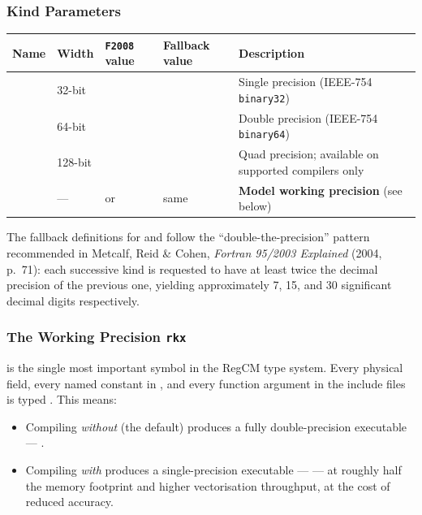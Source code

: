 \subsubsection{Kind Parameters}

\begin{longtable}{L{0.9cm} L{1.2cm} L{2.2cm} L{7cm} L{4cm}}
  \toprule
  \textbf{Name} & \textbf{Width} & \textbf{\texttt{F2008} value} & \textbf{Fallback value} & \textbf{Description} \\
  \midrule
  \endhead
  \bottomrule
  \endfoot
    & 32-bit  &   &                           & Single precision (IEEE-754 \texttt{binary32}) \\
    & 64-bit  &   &  & Double precision (IEEE-754 \texttt{binary64}) \\
   & 128-bit &  &  & Quad precision; available on supported compilers only \\
    & ---     &  or  & same & \textbf{Model working precision} (see below) \\
\end{longtable}

The fallback definitions for  and  follow the
``double-the-precision'' pattern recommended in Metcalf, Reid \& Cohen,
\textit{Fortran 95/2003 Explained} (2004, p.~71): each successive kind is
requested to have at least twice the decimal precision of the previous one,
yielding approximately 7, 15, and 30 significant decimal digits respectively.

\subsubsection{The Working Precision \texttt{rkx}}

 is the single most important symbol in the RegCM type system.
Every physical field, every named constant in , and every
function argument in the  include files is typed
. This means:

\begin{itemize}
  \item Compiling \emph{without}  (the default)
        produces a fully double-precision executable --- .
  \item Compiling \emph{with}  produces a
        single-precision executable ---  --- at roughly half
        the memory footprint and higher vectorisation throughput, at the cost
        of reduced accuracy.
\end{itemize}

